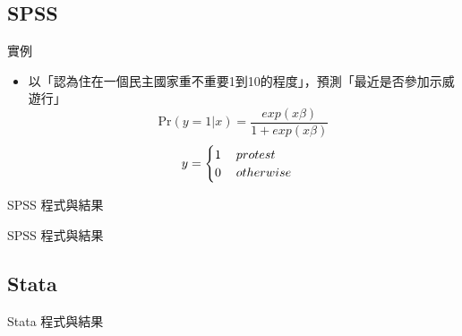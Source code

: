 \documentclass[border=10pt]{beamer}
\begin{document}
\subsection{SPSS}
\begin{frame}{實例}
\begin{itemize}
\item 以「認為住在一個民主國家重不重要1到10的程度」，預測「最近是否參加示威遊行」
\[ \text{Pr}(y=1|x)=\frac{exp(x\beta)}{1+exp(x\beta)} \]
\begin{align*}
y=\begin{cases}
1\hspace{1.2em}protest \\
0\hspace{1.2em}otherwise \\
\end{cases}
\end{align*}
\end{itemize}
\end{frame}
\begin{frame}{SPSS 程式與結果}
\end{frame}
\begin{frame}{SPSS 程式與結果}
\end{frame}
\subsection{Stata}
\begin{frame}{Stata 程式與結果}
\end{frame}
\end{document}
